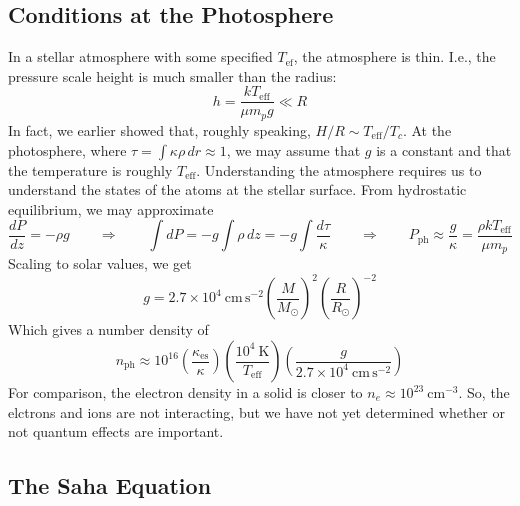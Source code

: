 \documentclass[10pt]{article}
\numberwithin{equation}{section}
\begin{document}
    \subsection{Conditions at the Photosphere} %
    \label{sub:bonus_material}
    In a stellar atmosphere with some specified $T_{\mathrm{ef}}$, the
    atmosphere is thin. I.e., the pressure scale height is much smaller than
    the radius:
    \begin{equation}
      \label{bonus:1} h = \frac{kT_{\mathrm{eff}}}{\mu m_p g} \ll R
    \end{equation}
    In fact, we earlier showed that, roughly speaking, $H/R \sim
    T_{\mathrm{eff}}/T_c$. At the photosphere, where $\tau = \int \kappa
    \rho\,dr \approx 1$, we may assume that $g$ is a constant and that the
    temperature is roughly $T_{\mathrm{eff}}$. Understanding the atmosphere
    requires us to understand the states of the atoms at the stellar surface.
    From hydrostatic equilibrium, we may approximate
    \begin{equation}
      \label{eq:bonus:2} \frac{dP}{dz} = -\rho g \qquad \Rightarrow \qquad \int
      dP = -g\int \rho\,dz = -g\int \frac{d\tau}{\kappa} \qquad \Rightarrow
      \qquad P_{\mathrm{ph}} \approx \frac{g}{\kappa} = \frac{\rho k
      T_{\mathrm{eff}}}{\mu m_p}
    \end{equation}
    Scaling to solar values, we get
    \begin{equation}
      \label{eq:bonus:3} g = 2.7\times 10^4\ \mathrm{cm\,s^{-2}}
      \left(\frac{M}{M_\odot}\right)^2\left(\frac{R}{R_{\odot}}\right)^{-2}
    \end{equation}
    Which gives a number density of 
    \begin{equation}
      \label{eq:bonus:4} n_{\mathrm{ph}} \approx 10^{16}
      \left(\frac{\kappa_{\mathrm{es}}}{\kappa}\right)\left(\frac{10^4\
      \mathrm{K}}{T_{\mathrm{eff}}}\right) \left(\frac{g}{2.7\times 10^4\
      \mathrm{cm\,s^{-2}}}\right)
    \end{equation}
    For comparison, the electron density in a solid is closer to $n_e\approx
    10^{23}\ \mathrm{cm^{-3}}$. So, the elctrons and ions are not interacting,
    but we have not yet determined whether or not quantum effects are important.
    
    
    \subsection{The Saha Equation}
    \label{sec:saha-equation}
 
\end{document}

